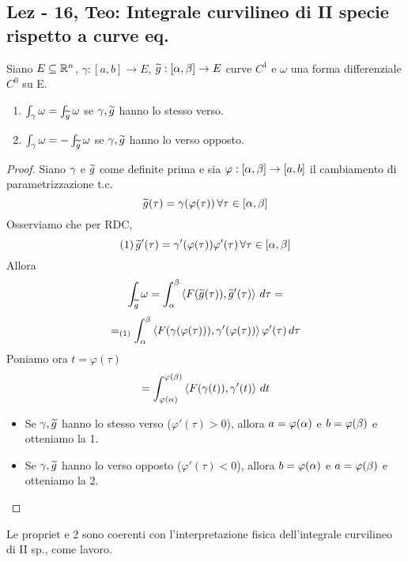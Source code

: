 \subsection{Lez - 16, Teo: Integrale curvilineo di II specie rispetto a curve eq.}
\begin{theorem}
  Siano $E\subseteq\mathbb{R}^n$, $\gamma:[a,b]\to E$, $\widetilde{g} : [\alpha,\beta]\to E$ curve $C^1$
  e $\omega$ una forma differenziale $C^0$ su E.
  \begin{enumerate}
    \item $\int_{\gamma} \omega = \int_{\widetilde{g}} \omega $ se $\gamma,\widetilde{g}$ hanno lo stesso verso.
    \item $\int_{\gamma} \omega = -\int_{\widetilde{g}} \omega $ se $\gamma,\widetilde{g}$ hanno lo verso opposto.
  \end{enumerate}
  \begin{proof}
    Siano $\gamma$ e $\widetilde{g}$ come definite prima e sia $\varphi : [\alpha,\beta]\to [a,b]$ il cambiamento
    di parametrizzazione t.c.
    $$\widetilde{g}(\tau) = \gamma(\varphi(\tau)) \, \forall \tau \in [\alpha,\beta]$$
    Osserviamo che per RDC, 
    $$(1) \, \widetilde{g}'(\tau) = \gamma'(\varphi(\tau))\varphi'(\tau) \, \forall \tau \in [\alpha,\beta]$$
    Allora 
    $$\int_{\widetilde{g}} \omega = \int_{\alpha}^{\beta} \left\langle F(\widetilde{g}(\tau)), \widetilde{g}'(\tau) \right\rangle \,d\tau = $$
    $$=_{(1)} \int_{\alpha}^{\beta} \left\langle F(\gamma(\varphi(\tau))), \gamma'(\varphi(\tau)) \right\rangle\varphi'(\tau) \, d\tau$$
    Poniamo ora $t = \varphi(\tau)$
    $$= \int_{\varphi(\alpha)}^{\varphi(\beta)} \left\langle F(\gamma(t)), \gamma'(t) \right\rangle \, dt$$ 
    \begin{itemize}
      \item Se $\gamma,\widetilde{g}$ hanno lo stesso verso ($\varphi'(\tau)>0$), allora $a = \varphi(\alpha)$ e 
            $b=\varphi(\beta)$ e otteniamo la 1.
      \item Se $\gamma,\widetilde{g}$ hanno lo verso opposto ($\varphi'(\tau)<0$), allora $b = \varphi(\alpha)$ e 
            $a=\varphi(\beta)$ e otteniamo la 2.
    \end{itemize}
  \end{proof}
\end{theorem}
\begin{osservazione}
  Le propriet e 2 sono coerenti con l'interpretazione fisica dell'integrale curvilineo di II sp., come lavoro.
\end{osservazione}
